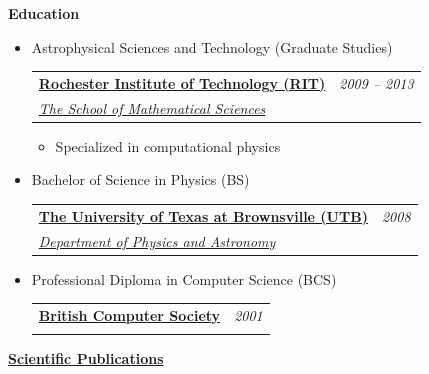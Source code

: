 \documentclass[11pt]{article}
\makeatletter
\newcommand{\resitem}[1]{\item #1 \vspace{-2pt}}
\newcommand{\resheading}[1]{{\large \colorbox{mygrey}{\begin{minipage}{\textwidth}{\textbf{#1 \vphantom{p\^{E}}}}\end{minipage}}}}
\newcommand{\ressubheading}[4]{
\begin{tabular*}{6.5in}{l@{\extracolsep{\fill}}r}
		\textbf{#1} & \textit{#2} \\
		\textit{#3} & \textit{#4} \\
\end{tabular*}\vspace{-6pt}}
\makeatother
\begin{document}
\begin{description}
\begin{figure}[h]
			\end{figure}
	\end{description} %
\resheading{Education}
	\begin{itemize}
		\item
		       Astrophysical Sciences and Technology (Graduate Studies)  \ressubheading{\href{http://www.rit.edu}{Rochester Institute of Technology (RIT)}}{2009 -- 2013}{\href{http://www.rit.edu/cos/astrophysics/}{The School of Mathematical Sciences }}{}
				{ \footnotesize
					\begin{itemize}
						\resitem{Specialized in computational physics }				
					\end{itemize}
				}
                       \item Bachelor of Science in Physics (BS)
                        \ressubheading{\href{http://www.utb.edu}{The University of Texas at Brownsville (UTB)}}{2008}{\href{http://www.phys.utb.edu/}{Department of Physics and Astronomy}}{}

			\item Professional Diploma in Computer Science (BCS)
                        \ressubheading{\href{http://www.bcs.org/}{British Computer Society }}{2001}{\href{http://www.phys.utb.edu/}{}}{}
            \end{itemize} %
\resheading{\href{http://arxiv.org/a/peiris_p_1.html}{Scientific Publications }}
\label{sec:publications}
\end{document}
